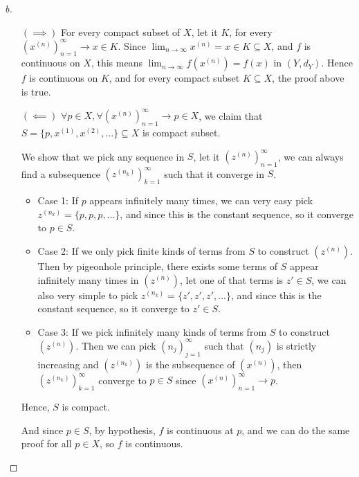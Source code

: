 \begin{proof}[b]
    \vphantom{text}
    \begin{itemize}
        \item [\((\implies )\)] For every compact subset of $X$, let it $K$, for every $(x^{(n)})_{n=1}^{\infty} \to x \in K$. Since $\lim_{n \to \infty} x^{(n)} = x \in K \subseteq X$, and $f$ is continuous on $X$, this means $\lim_{n \to \infty} f(x^{(n)}) = f(x)$ in $(Y, d_Y)$. Hence $f$ is continuous on $K$, and for every compact subset $K \subseteq X$, the proof above is true.
        \item [\((\impliedby )\)] $\forall p \in X, \forall (x^{(n)})_{n=1}^{\infty} \to p \in X$, we claim that $S = \{p, x^{(1)}, x^{(2)}, ...\} \subseteq X$ is compact subset.
        \begin{explanation}
            We show that we pick any sequence in $S$, let it $(z^{(n)})_{n=1}^{\infty}$, we can always find a subsequence $(z^{(n_k)})_{k=1}^{\infty}$ such that it converge in $S$.
            \begin{itemize}
                \item Case 1: If $p$ appears infinitely many times, we can very easy pick $z^{(n_k)} = \{p, p, p, ...\}$, and since this is the constant sequence, so it converge to $p \in S$. 
                \item Case 2: If we only pick finite kinds of terms from $S$ to construct $(z^{(n)})$. Then by pigeonhole principle, there exists some terms of $S$ appear infinitely many times in $(z^{(n)})$, let one of that terms is $z' \in S$, we can also very simple to pick $z^{(n_k)} = \{z', z', z', ...\}$, and since this is the constant sequence, so it converge to $z' \in S$.
                \item Case 3: If we pick infinitely many kinds of terms from $S$ to construct $(z^{(n)})$. Then we can pick $(n_j)_{j=1}^{\infty}$ such that $(n_j)$ is strictly increasing and $(z^{(n_k)})$ is the subsequence of $(x^{(n)})$, then $(z^{(n_k)})_{k=1}^{\infty}$ converge to $p \in S$ since $(x^{(n)})_{n=1}^{\infty} \to p$.
            \end{itemize}
            Hence, $S$ is compact.
        \end{explanation}
        And since $p \in S$, by hypothesis, $f$ is continuous at $p$, and we can do the same proof for all $p \in X$, so $f$ is continuous.
    \end{itemize}
\end{proof}